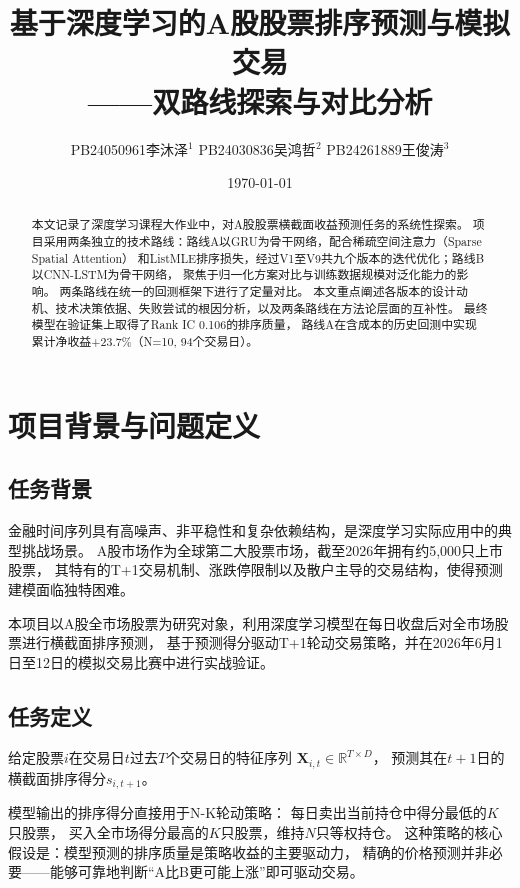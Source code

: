 \documentclass[12pt,a4paper]{ctexart}
\title{\bfseries 基于深度学习的A股股票排序预测与模拟交易\\
        ——双路线探索与对比分析}
\author{
    PB24050961\;李沐泽$^{1}$ \quad
    PB24030836\;吴鸿哲$^{2}$ \quad
    PB24261889\;王俊涛$^{3}$
}
\date{\today}
\begin{document}
\maketitle
\n\tableofcontents
\newpage

\begin{abstract}
\noindent
本文记录了深度学习课程大作业中，对A股股票横截面收益预测任务的系统性探索。
项目采用两条独立的技术路线：路线A以GRU为骨干网络，配合稀疏空间注意力（Sparse Spatial Attention）
和ListMLE排序损失，经过V1至V9共九个版本的迭代优化；路线B以CNN-LSTM为骨干网络，
聚焦于归一化方案对比与训练数据规模对泛化能力的影响。
两条路线在统一的回测框架下进行了定量对比。
本文重点阐述各版本的设计动机、技术决策依据、失败尝试的根因分析，以及两条路线在方法论层面的互补性。
最终模型在验证集上取得了Rank IC 0.106的排序质量，
路线A在含成本的历史回测中实现累计净收益+23.7\%（N=10, 94个交易日）。
\end{abstract}

\section{项目背景与问题定义}

\subsection{任务背景}

金融时间序列具有高噪声、非平稳性和复杂依赖结构，是深度学习实际应用中的典型挑战场景。
A股市场作为全球第二大股票市场，截至2026年拥有约5,000只上市股票，
其特有的T+1交易机制、涨跌停限制以及散户主导的交易结构，使得预测建模面临独特困难。

本项目以A股全市场股票为研究对象，利用深度学习模型在每日收盘后对全市场股票进行横截面排序预测，
基于预测得分驱动T+1轮动交易策略，并在2026年6月1日至12日的模拟交易比赛中进行实战验证。

\subsection{任务定义}

给定股票$i$在交易日$t$过去$T$个交易日的特征序列
$\mathbf{X}_{i,t} \in \mathbb{R}^{T \times D}$，
预测其在$t+1$日的横截面排序得分$s_{i,t+1}$。

模型输出的排序得分直接用于N-K轮动策略：
每日卖出当前持仓中得分最低的$K$只股票，
买入全市场得分最高的$K$只股票，维持$N$只等权持仓。
这种策略的核心假设是：模型预测的排序质量是策略收益的主要驱动力，
精确的价格预测并非必要——能够可靠地判断“A比B更可能上涨”即可驱动交易。
\end{document}
